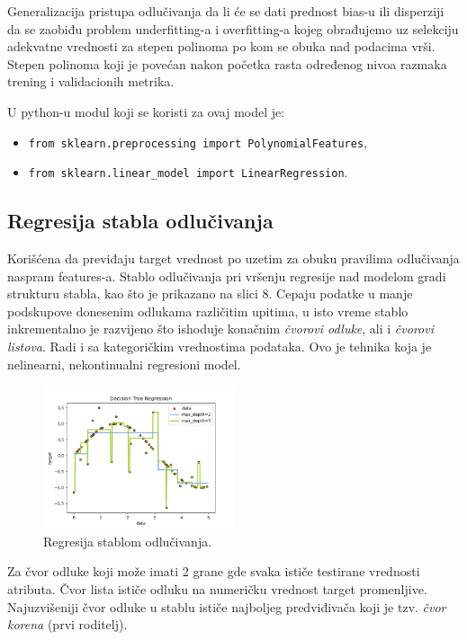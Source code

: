 \documentclass[fontsize=12bp, paper=a4]{scrarticle}
\begin{document}
Generalizacija pristupa odlučivanja da li će se dati prednost bias-u ili disperziji da se zaobiđu problem underfitting-a i overfitting-a kojeg obrađujemo uz selekciju adekvatne vrednosti za stepen polinoma po kom se obuka nad podacima vrši. Stepen polinoma koji je povećan nakon početka rasta određenog nivoa razmaka trening i validacionih metrika.

U python-u modul koji se koristi za ovaj model je:
\begin{itemize}
    \item \verb|from sklearn.preprocessing import PolynomialFeatures|,
    \item \verb|from sklearn.linear_model import LinearRegression|.
\end{itemize}

\newpage
\subsection{Regresija stabla odlučivanja}
Korišćena da previđaju target vrednost po uzetim za obuku pravilima odlučivanja naspram features-a. Stablo odlučivanja pri vršenju regresije nad modelom gradi strukturu stabla, kao što je prikazano na slici 8. Cepaju podatke u manje podskupove donesenim odlukama različitim upitima, u isto vreme stablo inkrementalno je razvijeno što ishoduje konačnim \textit{čvorovi odluke}, ali i \textit{čvorovi listova}. Radi i sa kategoričkim vrednostima podataka. Ovo je tehnika koja je nelinearni, nekontinualni regresioni model.

\begin{figure}[h!]
    \centering
    \includegraphics[width=0.5\textwidth]{8.png}
    \caption{\centering Regresija stablom odlučivanja.}
\end{figure}

Za čvor odluke koji može imati 2 grane gde svaka ističe testirane vrednosti atributa. Čvor lista ističe odluku na numeričku vrednost target promenljive. Najuzvišeniji čvor odluke u stablu ističe najboljeg predviđivača koji je tzv. \textit{čvor korena} (prvi roditelj).
\end{document}
